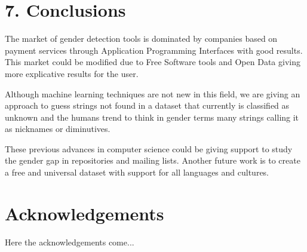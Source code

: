 \documentclass[a4paper]{article}
\begin{document}
\section*{7. Conclusions}

The market of gender detection tools is dominated by companies based on payment services through Application Programming Interfaces with good results. 
This market could be modified due to Free Software tools and Open Data giving more explicative results for the user.

Although machine learning techniques are not new in this field, we are giving an approach to guess strings not found in a dataset that currently is classified as unknown and the humans trend to think in gender terms many strings calling it as nicknames or diminutives.

These previous advances in computer science could be giving support to study the gender gap in repositories and mailing lists.
Another future work is to create a free and universal dataset with support for all languages and cultures.

\section*{Acknowledgements}

Here the acknowledgements come...

 

\end{document}
